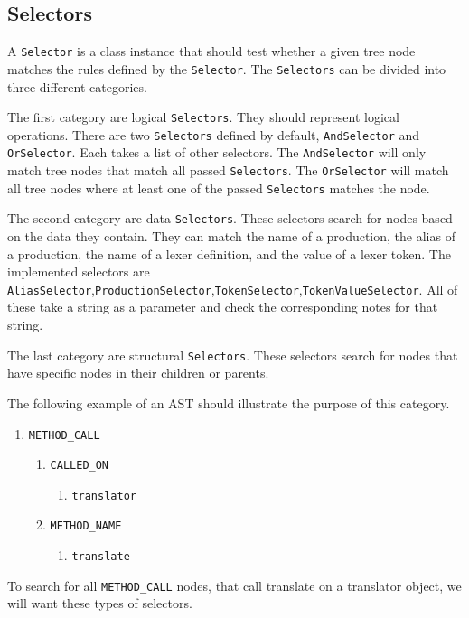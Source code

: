 
\subsection{Selectors}

A \verb|Selector| is a class instance that should test whether a given tree node matches the rules defined by the \verb|Selector|. 
The \verb|Selectors| can be divided into three different categories.

The first category are logical \verb|Selectors|. They should represent logical operations. 
There are two \verb|Selectors| defined by default, \verb|AndSelector| and \verb|OrSelector|. 
Each takes a list of other selectors. The \verb|AndSelector| will only match tree nodes that match all passed \verb|Selectors|. 
The \verb|OrSelector| will match all tree nodes where at least one of the passed \verb|Selectors| matches the node.


The second category are data \verb|Selectors|. 
These selectors search for nodes based on the data they contain. 
They can match the name of a production, the alias of a production, the name of a lexer definition, and the value of a lexer token. 
The implemented selectors are \verb|AliasSelector|,\verb|ProductionSelector|,\verb|TokenSelector|,\verb|TokenValueSelector|. 
All of these take a string as a parameter and check the corresponding notes for that string.


The last category are structural \verb|Selectors|. 
These selectors search for nodes that have specific nodes in their children or parents.

The following example of an AST should illustrate the purpose of this category.
\begin{enumerate}
\item \verb|METHOD_CALL|
\begin{enumerate}
\item \verb|CALLED_ON|
\begin{enumerate}
\item \verb|translator|
\end{enumerate}
\item \verb|METHOD_NAME|
\begin{enumerate}
\item \verb|translate|
\end{enumerate}
\end{enumerate}
\end{enumerate}
To search for all \verb|METHOD_CALL| nodes, that call translate on a translator object, we will want these types of selectors.

